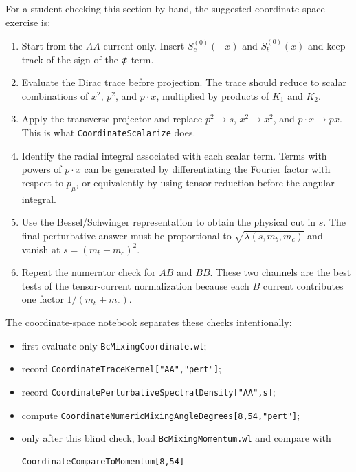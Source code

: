 \documentclass[11pt]{article}
\begin{document}
For a student checking this section by hand, the suggested coordinate-space
exercise is:
\begin{enumerate}
  \item Start from the \(AA\) current only.  Insert \(S_c^{(0)}(-x)\) and
  \(S_b^{(0)}(x)\) and keep track of the sign of the \(\slashed{x}\) term.
  \item Evaluate the Dirac trace before projection.  The trace should reduce
  to scalar combinations of \(x^2\), \(p^2\), and \(p\cdot x\), multiplied by
  products of \(K_1\) and \(K_2\).
  \item Apply the transverse projector and replace
  \(p^2\to s\), \(x^2\to x^2\), and \(p\cdot x\to px\).  This is what
  \texttt{CoordinateScalarize} does.
  \item Identify the radial integral associated with each scalar term.  Terms
  with powers of \(p\cdot x\) can be generated by differentiating the Fourier
  factor with respect to \(p_\mu\), or equivalently by using tensor reduction
  before the angular integral.
  \item Use the Bessel/Schwinger representation to obtain the physical cut in
  \(s\).  The final perturbative answer must be proportional to
  \(\sqrt{\lambda(s,m_b,m_c)}\) and vanish at \(s=(m_b+m_c)^2\).
  \item Repeat the numerator check for \(AB\) and \(BB\).  These two channels
  are the best tests of the tensor-current normalization because each \(B\)
  current contributes one factor \(1/(m_b+m_c)\).
\end{enumerate}

The coordinate-space notebook separates these checks intentionally:
\begin{itemize}
  \item first evaluate only \texttt{BcMixingCoordinate.wl};
  \item record \texttt{CoordinateTraceKernel["AA","pert"]};
  \item record \texttt{CoordinatePerturbativeSpectralDensity["AA",s]};
  \item compute \texttt{CoordinateNumericMixingAngleDegrees[8,54,"pert"]};
  \item only after this blind check, load \texttt{BcMixingMomentum.wl} and
  compare with
\begin{verbatim}
CoordinateCompareToMomentum[8,54]
\end{verbatim}
\end{itemize}
\end{document}
